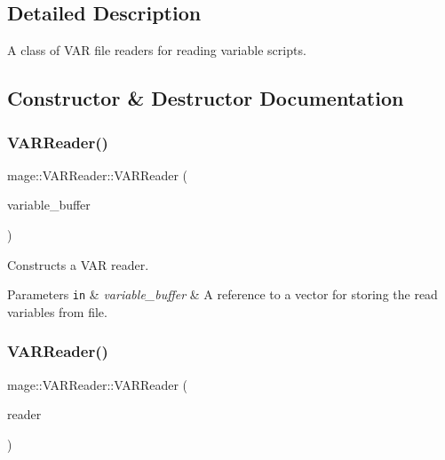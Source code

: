 \subsection{Detailed Description}
A class of V\+AR file readers for reading variable scripts. 

\subsection{Constructor \& Destructor Documentation}
\hypertarget{classmage_1_1_v_a_r_reader_a3c38bbcce8a6983163a8335560f9814b}{}\label{classmage_1_1_v_a_r_reader_a3c38bbcce8a6983163a8335560f9814b} 
\subsubsection{\texorpdfstring{V\+A\+R\+Reader()}{VARReader()}\hspace{0.1cm}{\footnotesize\ttfamily [1/3]}}
{\footnotesize\ttfamily mage\+::\+V\+A\+R\+Reader\+::\+V\+A\+R\+Reader (\begin{DoxyParamCaption}\item[{vector$<$ \hyperlink{structmage_1_1_variable}{Variable} $>$ \&}]{variable\+\_\+buffer }\end{DoxyParamCaption})\hspace{0.3cm}{\ttfamily [explicit]}}

Constructs a V\+AR reader.


\begin{DoxyParams}[1]{Parameters}
\mbox{\tt in}  & {\em variable\+\_\+buffer} & A reference to a vector for storing the read variables from file. \\
\hline
\end{DoxyParams}
\hypertarget{classmage_1_1_v_a_r_reader_a42faf193700b82813727aa943ded3940}{}\label{classmage_1_1_v_a_r_reader_a42faf193700b82813727aa943ded3940} 
\subsubsection{\texorpdfstring{V\+A\+R\+Reader()}{VARReader()}\hspace{0.1cm}{\footnotesize\ttfamily [2/3]}}
{\footnotesize\ttfamily mage\+::\+V\+A\+R\+Reader\+::\+V\+A\+R\+Reader (\begin{DoxyParamCaption}\item[{const \hyperlink{classmage_1_1_v_a_r_reader}{V\+A\+R\+Reader} \&}]{reader }\end{DoxyParamCaption})\hspace{0.3cm}{\ttfamily [delete]}}

